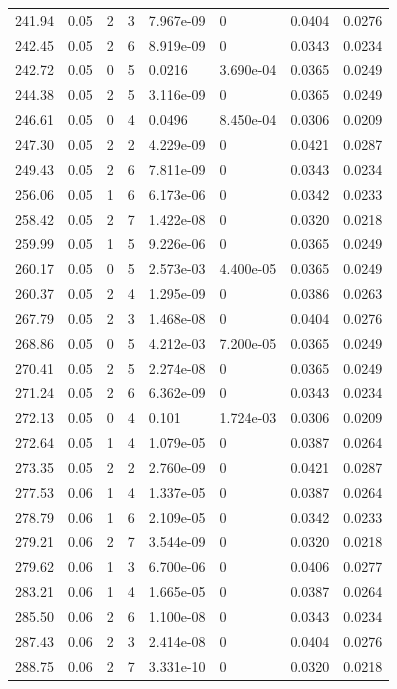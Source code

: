 \documentclass[preview]{standalone}
\begin{document}
{{{{\begin{tabular}{L{1.2cm}C{1.2cm} C{0.3cm}C{0.5cm} C{1.4cm}C{1.4cm} C{1.4cm}C{1.4cm}}
  241.94  &  0.05  & 2     &  3 &  7.967e-09  & 0  & 0.0404 &  0.0276   \\ 
  242.45  &  0.05  & 2     &  6 &  8.919e-09  & 0  & 0.0343 &  0.0234   \\ 
  242.72  &  0.05  & 0     &  5 &  0.0216  & 3.690e-04  & 0.0365 &  0.0249   \\ 
  244.38  &  0.05  & 2     &  5 &  3.116e-09  & 0  & 0.0365 &  0.0249   \\ 
  246.61  &  0.05  & 0     &  4 &  0.0496  & 8.450e-04  & 0.0306 &  0.0209   \\ 
  247.30  &  0.05  & 2     &  2 &  4.229e-09  & 0  & 0.0421 &  0.0287   \\ 
  249.43  &  0.05  & 2     &  6 &  7.811e-09  & 0  & 0.0343 &  0.0234   \\ 
  256.06  &  0.05  & 1     &  6 &  6.173e-06  & 0  & 0.0342 &  0.0233   \\ 
  258.42  &  0.05  & 2     &  7 &  1.422e-08  & 0  & 0.0320 &  0.0218   \\ 
  259.99  &  0.05  & 1     &  5 &  9.226e-06  & 0  & 0.0365 &  0.0249   \\ 
  260.17  &  0.05  & 0     &  5 &  2.573e-03  & 4.400e-05  & 0.0365 &  0.0249   \\ 
  260.37  &  0.05  & 2     &  4 &  1.295e-09  & 0  & 0.0386 &  0.0263   \\ 
  267.79  &  0.05  & 2     &  3 &  1.468e-08  & 0  & 0.0404 &  0.0276   \\ 
  268.86  &  0.05  & 0     &  5 &  4.212e-03  & 7.200e-05  & 0.0365 &  0.0249   \\ 
  270.41  &  0.05  & 2     &  5 &  2.274e-08  & 0  & 0.0365 &  0.0249   \\ 
  271.24  &  0.05  & 2     &  6 &  6.362e-09  & 0  & 0.0343 &  0.0234   \\ 
  272.13  &  0.05  & 0     &  4 &  0.101  & 1.724e-03  & 0.0306 &  0.0209   \\ 
  272.64  &  0.05  & 1     &  4 &  1.079e-05  & 0  & 0.0387 &  0.0264   \\ 
  273.35  &  0.05  & 2     &  2 &  2.760e-09  & 0  & 0.0421 &  0.0287   \\ 
  277.53  &  0.06  & 1     &  4 &  1.337e-05  & 0  & 0.0387 &  0.0264   \\ 
  278.79  &  0.06  & 1     &  6 &  2.109e-05  & 0  & 0.0342 &  0.0233   \\ 
  279.21  &  0.06  & 2     &  7 &  3.544e-09  & 0  & 0.0320 &  0.0218   \\ 
  279.62  &  0.06  & 1     &  3 &  6.700e-06  & 0  & 0.0406 &  0.0277   \\ 
  283.21  &  0.06  & 1     &  4 &  1.665e-05  & 0  & 0.0387 &  0.0264   \\ 
  285.50  &  0.06  & 2     &  6 &  1.100e-08  & 0  & 0.0343 &  0.0234   \\ 
  287.43  &  0.06  & 2     &  3 &  2.414e-08  & 0  & 0.0404 &  0.0276   \\ 
  288.75  &  0.06  & 2     &  7 &  3.331e-10  & 0  & 0.0320 &  0.0218   \\ 
\hline 
\end{tabular} 

}}}}
\end{document}

